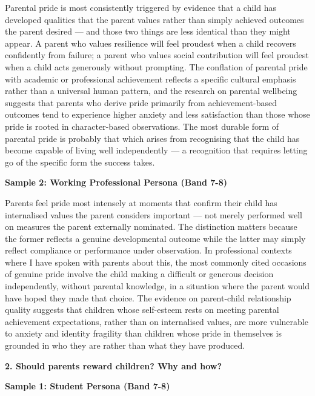 Parental pride is most consistently triggered by evidence that a child has developed qualities that the parent values rather than simply achieved outcomes the parent desired — and those two things are less identical than they might appear. A parent who values resilience will feel proudest when a child recovers confidently from failure; a parent who values social contribution will feel proudest when a child acts generously without prompting. The conflation of parental pride with academic or professional achievement reflects a specific cultural emphasis rather than a universal human pattern, and the research on parental wellbeing suggests that parents who derive pride primarily from achievement-based outcomes tend to experience higher anxiety and less satisfaction than those whose pride is rooted in character-based observations. The most durable form of parental pride is probably that which arises from recognising that the child has become capable of living well independently — a recognition that requires letting go of the specific form the success takes.

\textbf{Sample 2: Working Professional Persona (Band 7-8)}

Parents feel pride most intensely at moments that confirm their child has internalised values the parent considers important — not merely performed well on measures the parent externally nominated. The distinction matters because the former reflects a genuine developmental outcome while the latter may simply reflect compliance or performance under observation. In professional contexts where I have spoken with parents about this, the most commonly cited occasions of genuine pride involve the child making a difficult or generous decision independently, without parental knowledge, in a situation where the parent would have hoped they made that choice. The evidence on parent-child relationship quality suggests that children whose self-esteem rests on meeting parental achievement expectations, rather than on internalised values, are more vulnerable to anxiety and identity fragility than children whose pride in themselves is grounded in who they are rather than what they have produced.

\separator

\begin{ieltsquestion}
\textbf{2. Should parents reward children? Why and how?}
\end{ieltsquestion}
\textbf{Sample 1: Student Persona (Band 7-8)}

